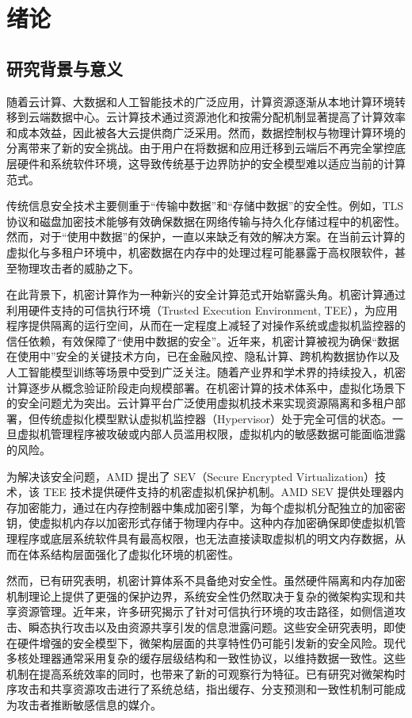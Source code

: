 \chapter{绪论}

\section{研究背景与意义}

随着云计算、大数据和人工智能技术的广泛应用，计算资源逐渐从本地计算环境转移到云端数据中心。云计算技术通过资源池化和按需分配机制显著提高了计算效率和成本效益，因此被各大云提供商广泛采用。然而，数据控制权与物理计算环境的分离带来了新的安全挑战。由于用户在将数据和应用迁移到云端后不再完全掌控底层硬件和系统软件环境，这导致传统基于边界防护的安全模型难以适应当前的计算范式\cite{lee2013view}。

传统信息安全技术主要侧重于“传输中数据”和“存储中数据”的安全性。例如，TLS 协议和磁盘加密技术能够有效确保数据在网络传输与持久化存储过程中的机密性。然而，对于“使用中数据”的保护，一直以来缺乏有效的解决方案。在当前云计算的虚拟化与多租户环境中，机密数据在内存中的处理过程可能暴露于高权限软件，甚至物理攻击者的威胁之下\cite{win2014virtual}。

在此背景下，机密计算作为一种新兴的安全计算范式开始崭露头角。机密计算通过利用硬件支持的可信执行环境（Trusted Execution Environment, TEE），为应用程序提供隔离的运行空间，从而在一定程度上减轻了对操作系统或虚拟机监控器的信任依赖\cite{sabt2015trusted}，有效保障了“使用中数据的安全”。近年来，机密计算被视为确保“数据在使用中”安全的关键技术方向，已在金融风控、隐私计算、跨机构数据协作以及人工智能模型训练等场景中受到广泛关注\cite{confidentialcomputingconsortium2022}。随着产业界和学术界的持续投入，机密计算逐步从概念验证阶段走向规模部署\cite{agarwal2025confidential}。在机密计算的技术体系中，虚拟化场景下的安全问题尤为突出。云计算平台广泛使用虚拟机技术来实现资源隔离和多租户部署，但传统虚拟化模型默认虚拟机监控器（Hypervisor）处于完全可信的状态\cite{garfinkel2003virtual}。一旦虚拟机管理程序被攻破或内部人员滥用权限，虚拟机内的敏感数据可能面临泄露的风险。

为解决该安全问题，AMD 提出了 SEV（Secure Encrypted Virtualization）技术，该 TEE 技术提供硬件支持的机密虚拟机保护机制。AMD SEV 提供处理器内存加密能力，通过在内存控制器中集成加密引擎，为每个虚拟机分配独立的加密密钥，使虚拟机内存以加密形式存储于物理内存中\cite{kaplan2016amd}。这种内存加密确保即使虚拟机管理程序或底层系统软件具有最高权限，也无法直接读取虚拟机的明文内存数据，从而在体系结构层面强化了虚拟化环境的机密性。

然而，已有研究表明，机密计算体系不具备绝对安全性。虽然硬件隔离和内存加密机制理论上提供了更强的保护边界，系统安全性仍然取决于复杂的微架构实现和共享资源管理。近年来，许多研究揭示了针对可信执行环境的攻击路径，如侧信道攻击、瞬态执行攻击以及由资源共享引发的信息泄露问题\cite{bulck2018foreshadow}\cite{lou2022survey}。这些安全研究表明，即使在硬件增强的安全模型下，微架构层面的共享特性仍可能引发新的安全风险。现代多核处理器通常采用复杂的缓存层级结构和一致性协议，以维持数据一致性。这些机制在提高系统效率的同时，也带来了新的可观察行为特征。已有研究对微架构时序攻击和共享资源攻击进行了系统总结，指出缓存、分支预测和一致性机制可能成为攻击者推断敏感信息的媒介\cite{ge2018survey}。

